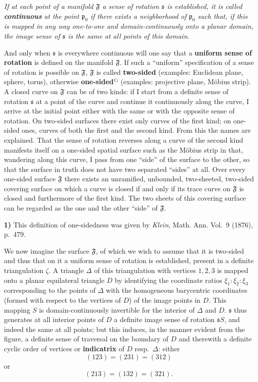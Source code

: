 \documentclass{article}
\begin{document}
\emph{If at each point of a manifold $\mathfrak{F}$ a sense of rotation $\mathfrak{s}$ is established, it is called \textbf{continuous} at the point $\mathfrak{p}_0$ if there exists a neighborhood of $\mathfrak{p}_0$ such that, if this is mapped in any way one-to-one and domain-continuously onto a planar domain, the image sense of $\mathfrak{s}$ is the same at all points of this domain.}

And only when $\mathfrak{s}$ is everywhere continuous will one say that a \textbf{uniform sense of rotation} is defined on the manifold $\mathfrak{F}$. If such a ``uniform'' specification of a sense of rotation is possible on $\mathfrak{F}$, $\mathfrak{F}$ is called \textbf{two-sided} (examples: Euclidean plane, sphere, torus), otherwise \textbf{one-sided}${}^{1)}$ (examples: projective plane, Möbius strip). A closed curve on $\mathfrak{F}$ can be of two kinds: if I start from a definite sense of rotation $\mathfrak{s}$ at a point of the curve and continue it continuously along the curve, I arrive at the initial point either with the same or with the opposite sense of rotation. On two-sided surfaces there exist only curves of the first kind; on one-sided ones, curves of both the first and the second kind. From this the names are explained. That the sense of rotation reverses along a curve of the second kind manifests itself on a one-sided spatial surface such as the Möbius strip in that, wandering along this curve, I pass from one ``side'' of the surface to the other, so that the surface in truth does not have two separated ``sides'' at all. Over every one-sided surface $\mathfrak{F}$ there exists an unramified, unbounded, two-sheeted, two-sided covering surface on which a curve is closed if and only if its trace curve on $\mathfrak{F}$ is closed and furthermore of the first kind. The two sheets of this covering surface can be regarded as the one and the other ``side'' of $\mathfrak{F}$.

\textbf{1)} This definition of one-sidedness was given by \emph{Klein}, Math. Ann. Vol.~9 (1876), p.~479.

We now imagine the surface $\mathfrak{F}$, of which we wish to assume that it is two-sided and thus that on it a uniform sense of rotation is established, present in a definite triangulation $\zeta$. A triangle $\Delta$ of this triangulation with vertices $1, 2, 3$ is mapped onto a planar equilateral triangle $D$ by identifying the coordinate ratios $\xi_1\colon \xi_2\colon \xi_3$ corresponding to the points of $\Delta$ with the homogeneous barycentric coordinates (formed with respect to the vertices of $D$) of the image points in $D$. This mapping $S$ is domain-continuously invertible for the interior of $\Delta$ and $D$. $\mathfrak{s}$ thus generates at all interior points of $D$ a definite image sense of rotation $\mathfrak{s} S$, and indeed the same at all points; but this induces, in the manner evident from the figure, a definite sense of traversal on the boundary of $D$ and therewith a definite cyclic order of vertices or \textbf{indicatrix} of $D$ resp.\ $\Delta$: either
\[ (123) = (231) = (312) \]
or
\[ (213) = (132) = (321). \]
\end{document}
